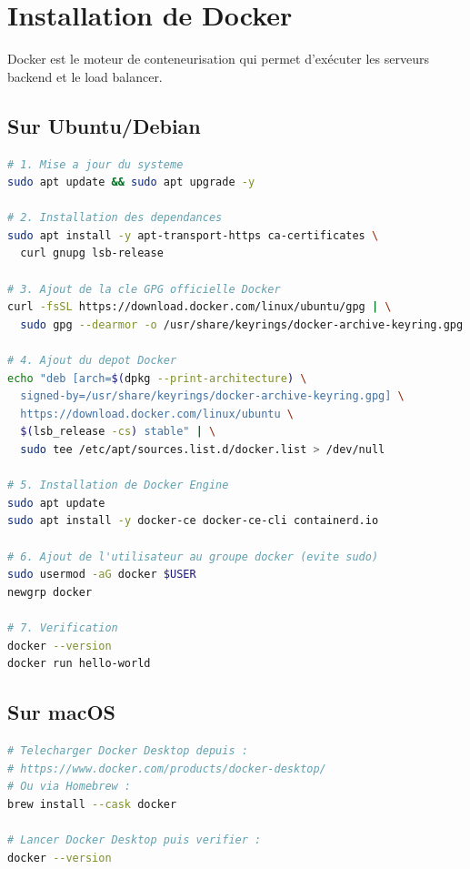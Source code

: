 \documentclass[12pt,a4paper]{report}
\begin{document}
\section{Installation de Docker}

Docker est le moteur de conteneurisation qui permet d'exécuter les serveurs backend et le load balancer.

\subsection{Sur Ubuntu/Debian}

\begin{lstlisting}[language=bash, caption={Installation de Docker sur Ubuntu/Debian}]
# 1. Mise a jour du systeme
sudo apt update && sudo apt upgrade -y

# 2. Installation des dependances
sudo apt install -y apt-transport-https ca-certificates \
  curl gnupg lsb-release

# 3. Ajout de la cle GPG officielle Docker
curl -fsSL https://download.docker.com/linux/ubuntu/gpg | \
  sudo gpg --dearmor -o /usr/share/keyrings/docker-archive-keyring.gpg

# 4. Ajout du depot Docker
echo "deb [arch=$(dpkg --print-architecture) \
  signed-by=/usr/share/keyrings/docker-archive-keyring.gpg] \
  https://download.docker.com/linux/ubuntu \
  $(lsb_release -cs) stable" | \
  sudo tee /etc/apt/sources.list.d/docker.list > /dev/null

# 5. Installation de Docker Engine
sudo apt update
sudo apt install -y docker-ce docker-ce-cli containerd.io

# 6. Ajout de l'utilisateur au groupe docker (evite sudo)
sudo usermod -aG docker $USER
newgrp docker

# 7. Verification
docker --version
docker run hello-world
\end{lstlisting}

\subsection{Sur macOS}

\begin{lstlisting}[language=bash, caption={Installation de Docker sur macOS}]
# Telecharger Docker Desktop depuis :
# https://www.docker.com/products/docker-desktop/
# Ou via Homebrew :
brew install --cask docker

# Lancer Docker Desktop puis verifier :
docker --version
\end{lstlisting}
\end{document}
